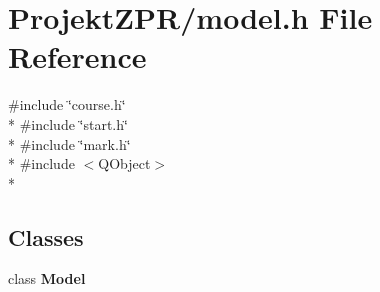 \section{Projekt\-Z\-P\-R/model.h File Reference}
\label{model_8h}
{\ttfamily \#include \char`\"{}course.\-h\char`\"{}}\\*
{\ttfamily \#include \char`\"{}start.\-h\char`\"{}}\\*
{\ttfamily \#include \char`\"{}mark.\-h\char`\"{}}\\*
{\ttfamily \#include $<$Q\-Object$>$}\\*
\subsection*{Classes}
\begin{DoxyCompactItemize}
\item 
class {\bf Model}
\end{DoxyCompactItemize}

